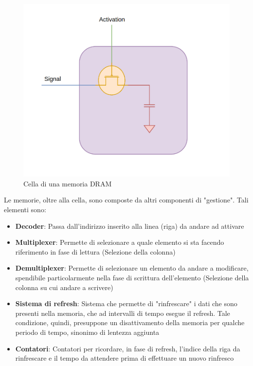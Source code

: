 \begin{figure}
    \centering
    \includegraphics[width=.3\textwidth]{img/DRAM-CELL.png}
    \caption{Cella di una memoria DRAM}\label{img:mem-dinamica}    
\end{figure}
Le memorie, oltre alla cella, sono composte da altri componenti di "gestione". Tali elementi sono:
\begin{itemize}
    \item \textbf{Decoder}: Passa dall'indirizzo inserito alla linea (riga) da andare ad attivare
    \item \textbf{Multiplexer}: Permette di selezionare a quale elemento si sta facendo riferimento in fase di lettura (Selezione della colonna)
    \item \textbf{Demultiplexer}: Permette di selezionare un elemento da andare a modificare, spendibile particolarmente nella fase di scrittura dell'elemento (Selezione della colonna su cui andare a scrivere)
    \item \textbf{Sistema di refresh}: Sistema che permette di "rinfrescare" i dati che sono presenti nella memoria, che ad intervalli di tempo esegue il refresh. Tale condizione, quindi, presuppone un disattivamento della memoria per qualche periodo di tempo, sinonimo di lentezza aggiunta
    \item \textbf{Contatori}: Contatori per ricordare, in fase di refresh, l'indice della riga da rinfrescare e il tempo da attendere prima di effettuare un nuovo rinfresco
\end{itemize}

